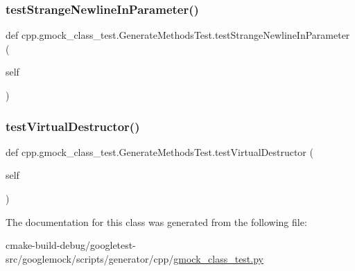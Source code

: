 \subsubsection{\texorpdfstring{testStrangeNewlineInParameter()}{testStrangeNewlineInParameter()}}
{\footnotesize\ttfamily def cpp.\+gmock\+\_\+class\+\_\+test.\+Generate\+Methods\+Test.\+test\+Strange\+Newline\+In\+Parameter (\begin{DoxyParamCaption}\item[{}]{self }\end{DoxyParamCaption})}

\mbox{\label{classcpp_1_1gmock__class__test_1_1GenerateMethodsTest_a3095f7046a089b3c8a13e7e8161a2ab2}} 
\subsubsection{\texorpdfstring{testVirtualDestructor()}{testVirtualDestructor()}}
{\footnotesize\ttfamily def cpp.\+gmock\+\_\+class\+\_\+test.\+Generate\+Methods\+Test.\+test\+Virtual\+Destructor (\begin{DoxyParamCaption}\item[{}]{self }\end{DoxyParamCaption})}



The documentation for this class was generated from the following file\+:\begin{DoxyCompactItemize}
\item 
cmake-\/build-\/debug/googletest-\/src/googlemock/scripts/generator/cpp/\mbox{\hyperlink{gmock__class__test_8py}{gmock\+\_\+class\+\_\+test.\+py}}\end{DoxyCompactItemize}
